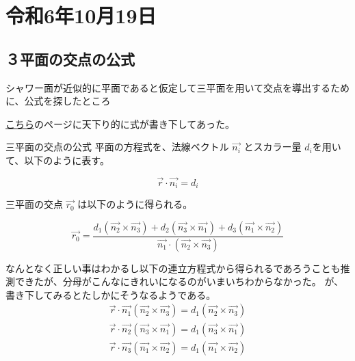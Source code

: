 
\section{令和6年10月19日}

\subsection{３平面の交点の公式}

シャワー面が近似的に平面であると仮定して三平面を用いて交点を導出するために、公式を探したところ

\href{https://maicommon.ciao.jp/ss/geom/plane/index.htm}{こちら}のページに天下り的に式が書き下してあった。

\begin{qbox}{三平面の交点の公式}
平面の方程式を、法線ベクトル $\overrightarrow{n_i}$ とスカラー量 $d_i$を用いて、以下のように表す。

\begin{equation}
\overrightarrow{r}\cdot \overrightarrow{n_i} = d_i
\end{equation}

三平面の交点 $\overrightarrow{r_0}$ は以下のように得られる。

\begin{equation}
    \overrightarrow{r_0} = \frac{d_1 (\overrightarrow{n_2}\times\overrightarrow{n_3}) + d_2 (\overrightarrow{n_3}\times\overrightarrow{n_1}) + d_3 (\overrightarrow{n_1}\times\overrightarrow{n_2})}{\overrightarrow{n_1}\cdot(\overrightarrow{n_2}\times\overrightarrow{n_3})}
\end{equation}

\end{qbox}

なんとなく正しい事はわかるし以下の連立方程式から得られるであろうことも推測できたが、分母がこんなにきれいになるのがいまいちわからなかった。
が、書き下してみるとたしかにそうなるようである。
\begin{eqnarray}
    \overrightarrow{r} \cdot \overrightarrow{n_1} ( \overrightarrow{n_2} \times \overrightarrow{n_3} ) = d_1 ( \overrightarrow{n_2} \times \overrightarrow{n_3} )  \\
    \overrightarrow{r} \cdot \overrightarrow{n_2} ( \overrightarrow{n_3} \times \overrightarrow{n_1} ) = d_1 ( \overrightarrow{n_3} \times \overrightarrow{n_1} )  \\
    \overrightarrow{r} \cdot \overrightarrow{n_3} ( \overrightarrow{n_1} \times \overrightarrow{n_2} ) = d_1 ( \overrightarrow{n_1} \times \overrightarrow{n_2} ) 
\end{eqnarray}

